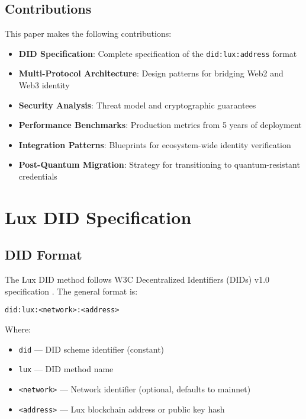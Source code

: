 \documentclass[11pt,a4paper]{article}
\begin{document}
\subsection{Contributions}

This paper makes the following contributions:

\begin{itemize}
  \item \textbf{DID Specification}: Complete specification of the \texttt{did:lux:address} format
  \item \textbf{Multi-Protocol Architecture}: Design patterns for bridging Web2 and Web3 identity
  \item \textbf{Security Analysis}: Threat model and cryptographic guarantees
  \item \textbf{Performance Benchmarks}: Production metrics from 5 years of deployment
  \item \textbf{Integration Patterns}: Blueprints for ecosystem-wide identity verification
  \item \textbf{Post-Quantum Migration}: Strategy for transitioning to quantum-resistant credentials
\end{itemize}

\section{Lux DID Specification}

\subsection{DID Format}

The Lux DID method follows W3C Decentralized Identifiers (DIDs) v1.0 specification \cite{did-core}. The general format is:

\begin{center}
\texttt{did:lux:<network>:<address>}
\end{center}

Where:
\begin{itemize}
  \item \texttt{did} — DID scheme identifier (constant)
  \item \texttt{lux} — DID method name
  \item \texttt{<network>} — Network identifier (optional, defaults to mainnet)
  \item \texttt{<address>} — Lux blockchain address or public key hash
\end{itemize}
\end{document}
